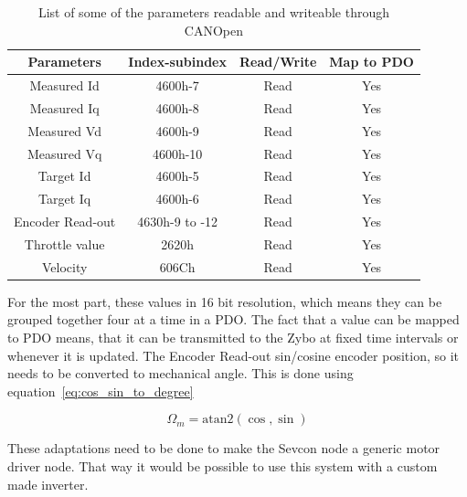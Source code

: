 \begin{table}[h]
	\centering
	\begin{tabular}{| c | c | c | c |}
		\hline
		Parameters & Index-subindex & Read/Write & Map to PDO \\ %
		\hline
		Measured Id & 4600h-7 & Read & Yes \\ %
		Measured Iq & 4600h-8 & Read & Yes \\ %
		Measured Vd & 4600h-9 & Read & Yes \\ %
		Measured Vq & 4600h-10 & Read & Yes \\ %
		Target Id & 4600h-5 & Read & Yes \\ %
		Target Iq & 4600h-6 & Read & Yes \\ %
		Encoder Read-out & 4630h-9 to -12 & Read & Yes \\ %
		Throttle value & 2620h & Read & Yes \\ %
		Velocity & 606Ch & Read & Yes \\ %
		\hline	
	\end{tabular}
	\caption{List of some of the parameters readable and writeable through CANOpen}
	\label{tab:parameters_of_interest}
\end{table}

For the most part, these values in 16 bit resolution, which means they can be grouped together four at a time in a PDO.
The fact that a value can be mapped to PDO means, that it can be transmitted to the Zybo at fixed time intervals or whenever it is updated.
The Encoder Read-out sin/cosine encoder position, so it needs to be converted to mechanical angle. 
This is done using equation~\ref{eq:cos_sin_to_degree}

\begin{equation}
\Omega_m = \mathrm{atan2}(\cos,\sin)
\label{eq:cos_sin_to_degree}
\end{equation}

These adaptations need to be done to make the Sevcon node a generic motor driver node.
That way it would be possible to use this system with a custom made inverter.
